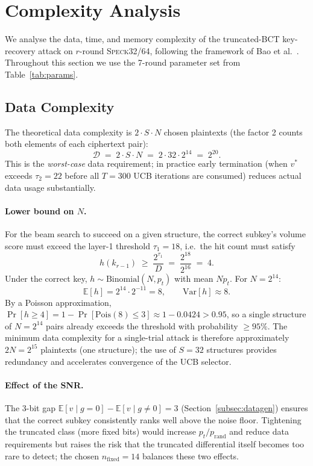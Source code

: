 \documentclass[runningheads]{llncs}
\newcommand{\speck}{\textsc{Speck}32/64}
\begin{document}
\section{Complexity Analysis}
\label{sec:complexity}

We analyse the data, time, and memory complexity of the truncated-BCT
key-recovery attack on $r$-round \speck{}, following the framework of
Bao et al.~\cite{BLY23}.  Throughout this section we use the 7-round
parameter set from Table~\ref{tab:params}.

\subsection{Data Complexity}

The theoretical data complexity is $2 \cdot S \cdot N$ chosen plaintexts
(the factor 2 counts both elements of each ciphertext pair):
\begin{equation}
  \label{eq:data}
  \mathcal{D} \;=\; 2 \cdot S \cdot N \;=\; 2 \cdot 32 \cdot 2^{14} \;=\; 2^{20}.
\end{equation}
This is the \emph{worst-case} data requirement; in practice early termination
(when $v^*$ exceeds $\tau_2 = 22$ before all $T = 300$ UCB iterations are
consumed) reduces actual data usage substantially.

\paragraph{Lower bound on $N$.}
For the beam search to succeed on a given structure, the correct
subkey's volume score must exceed the layer-1 threshold $\tau_1 = 18$,
i.e.\ the hit count must satisfy
\[
  h(k_{r-1}) \;\ge\; \frac{2^{\tau_1}}{D}
  \;=\; \frac{2^{18}}{2^{16}} \;=\; 4.
\]
Under the correct key, $h \sim \mathrm{Binomial}(N, p_t)$ with mean
$N p_t$.  For $N = 2^{14}$:
\[
  \mathbb{E}[h] = 2^{14} \cdot 2^{-11} = 8, \qquad
  \mathrm{Var}[h] \approx 8.
\]
By a Poisson approximation, $\Pr[h \ge 4] = 1 - \Pr[\mathrm{Pois}(8) \le 3]
\approx 1 - 0.0424 > 0.95$, so a single structure of $N = 2^{14}$ pairs
already exceeds the threshold with probability $\ge 95\%$.  The minimum
data complexity for a single-trial attack is therefore approximately
$2N = 2^{15}$ plaintexts (one structure); the use of $S = 32$ structures
provides redundancy and accelerates convergence of the UCB selector.

\paragraph{Effect of the SNR.}
The $3$-bit gap $\mathbb{E}[v \mid g{=}0] - \mathbb{E}[v \mid g{\ne}0] = 3$
(Section~\ref{subsec:datagen}) ensures that the correct subkey consistently
ranks well above the noise floor.  Tightening the truncated class (more
fixed bits) would increase $p_t/p_{\mathrm{rand}}$ and reduce data
requirements but raises the risk that the truncated differential itself
becomes too rare to detect; the chosen $n_{\mathrm{fixed}} = 14$ balances
these two effects.
\end{document}
